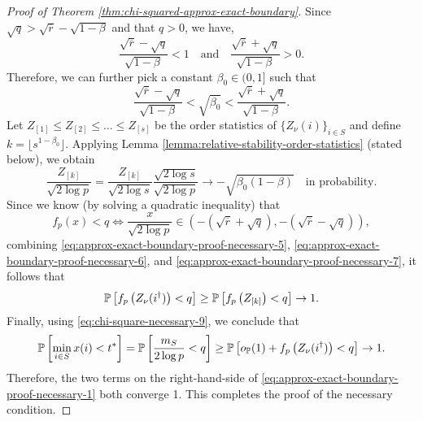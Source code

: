 \begin{proof}[Proof of Theorem \ref{thm:chi-squared-approx-exact-boundary}]
Since $\sqrt{q}>\sqrt{\overline{r}}-\sqrt{1-\beta}$ and that $q>0$, we have,
\begin{equation}
    \frac{\sqrt{\overline{r}}-\sqrt{q}}{\sqrt{1-\beta}}<1
    \quad\text{and}\quad
    \frac{\sqrt{\overline{r}}+\sqrt{q}}{\sqrt{1-\beta}}>0.
\end{equation}
Therefore, we can further pick a constant $\beta_0\in(0,1]$ such that
\begin{equation} \label{eq:approx-exact-boundary-proof-necessary-5}
    \frac{\sqrt{\overline{r}}-\sqrt{q}}{\sqrt{1-\beta}} 
    < \sqrt{\beta_0} < 
    \frac{\sqrt{\overline{r}}+\sqrt{q}}{\sqrt{1-\beta}}.
\end{equation}
Let $Z_{[1]}\le Z_{[2]}\le\ldots\le Z_{[s]}$ be the order statistics of 
$\{Z_\nu(i)\}_{i\in S}$ and define $k=\lfloor s^{1-\beta_0}\rfloor$.
Applying Lemma \ref{lemma:relative-stability-order-statistics} (stated below), we obtain
\begin{equation} \label{eq:approx-exact-boundary-proof-necessary-6}
    \frac{Z_{[k]}}{\sqrt{2\log{p}}}
    = \frac{Z_{[k]}}{\sqrt{2\log{s}}} \frac{\sqrt{2\log{s}}}{\sqrt{2\log{p}}} 
    \to -\sqrt{\beta_0(1-\beta)}
    \quad\text{in probability}.
\end{equation}
Since we know (by solving a quadratic inequality) that
\begin{equation} \label{eq:approx-exact-boundary-proof-necessary-7}
    f_p(x)<q \iff \frac{x}{\sqrt{2\log{p}}} \in \left(-(\sqrt{\overline{r}}+\sqrt{q}), -(\sqrt{\overline{r}}-\sqrt{q})\right),
\end{equation}
combining \eqref{eq:approx-exact-boundary-proof-necessary-5}, \eqref{eq:approx-exact-boundary-proof-necessary-6}, and 
\eqref{eq:approx-exact-boundary-proof-necessary-7}, it follows that
\begin{equation*}
    \P\left[ f_p\left(Z_\nu(i^\dagger)\right) < q \right] \ge \P\left[ f_p\left(Z_{[k]}\right) < q \right] \to 1.
\end{equation*}
Finally, using \eqref{eq:chi-square-necessary-9}, we conclude that 
$$
\P\left[\min_{i\in S}x(i)<t^*\right] = 
\P\left[\frac{m_{S}}{2\log{p}} < q\right] \ge
\P\left[o_\P(1) + f_p\left(Z_\nu(i^\dagger)\right) < q \right] \to 1.
$$
Therefore, the two terms on the right-hand-side of \eqref{eq:approx-exact-boundary-proof-necessary-1} both converge 1. 
This completes the proof of the necessary condition.
\end{proof}

